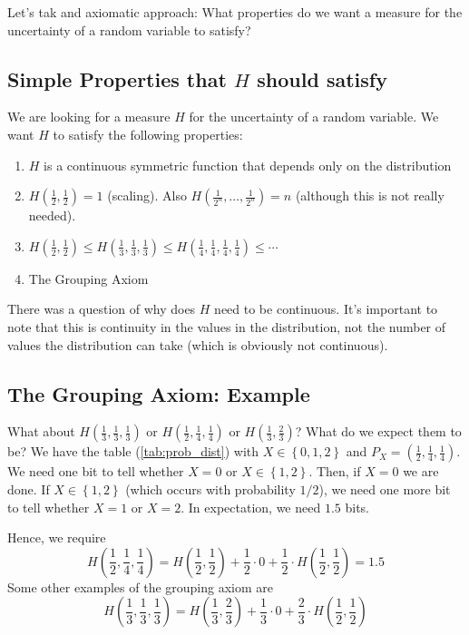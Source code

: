 \documentclass{article}
\begin{document}
Let's tak and axiomatic approach: What properties do we want a measure for the uncertainty of a random variable to satisfy?

\subsection{Simple Properties that $H$ should satisfy}

We are looking for a measure $H$ for the uncertainty of a random variable. We want $H$ to satisfy the following properties:
\begin{enumerate}
    \item $H$ is a continuous symmetric function that depends only on the distribution
    \item $H\left(\frac{1}{2},\frac{1}{2}\right)=1$ (scaling). Also $H\left(\frac{1}{2^n},\ldots,\frac{1}{2^n}\right)=n$ (although this is not really needed).
    \item $H\left(\frac{1}{2},\frac{1}{2}\right)\leq H\left(\frac{1}{3},\frac{1}{3},\frac{1}{3}\right)\leq H\left(\frac{1}{4},\frac{1}{4},\frac{1}{4},\frac{1}{4}\right)\leq \cdots$
    \item The Grouping Axiom 
\end{enumerate}
There was a question of why does $H$ need to be continuous. It's important to note that this is continuity in the values in the distribution, not the number of values the distribution can take (which is obviously not continuous).

\subsection{The Grouping Axiom: Example}

What about $H\left(\frac{1}{3},\frac{1}{3},\frac{1}{3}\right)$ or $H\left(\frac{1}{2},\frac{1}{4},\frac{1}{4}\right)$ or $H\left(\frac{1}{3},\frac{2}{3}\right)$? What do we expect them to be?
We have the table (\ref{tab:prob_dist}) with $X\in\left\{0,1,2\right\}$ and $P_X=\left( \frac{1}{2},\frac{1}{4},\frac{1}{4} \right)$. We need one bit to tell whether $X=0$ or $X\in\left\{1,2\right\}$. Then, if $X=0$ we are done. If $X\in\left\{1,2\right\}$ (which occurs with probability $1/2$), we need one more bit to tell whether $X=1$ or $X=2$. In expectation, we need $1.5$ bits.

Hence, we require 
\[
H\left( \frac{1}{2},\frac{1}{4},\frac{1}{4} \right) = H\left( \frac{1}{2},\frac{1}{2}\right) + \frac{1}{2}\cdot 0 + \frac{1}{2}\cdot H\left( \frac{1}{2},\frac{1}{2}\right)=1.5
\]
Some other examples of the grouping axiom are 
\[
H\left( \frac{1}{3},\frac{1}{3},\frac{1}{3} \right) = H\left( \frac{1}{3},\frac{2}{3} \right) + \frac{1}{3}\cdot 0 + \frac{2}{3}\cdot H\left( \frac{1}{2},\frac{1}{2} \right)
\]
\end{document}
